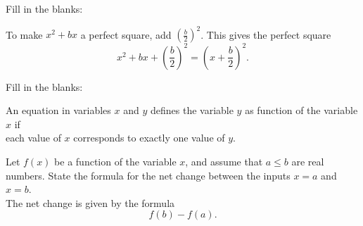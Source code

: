 \documentclass[12pt]{amsart}
\begin{document}
\begin{thm}[3 Points]\label{ex4}
  Fill in the blanks:\\
  \begin{center}
    To make $x^2 + bx$ a perfect square, add $\left(\frac{b}{2}\right)^2$.
    This gives the perfect square
    \vspace{.5in}
    $$x^2 + bx + \left(\frac{b}{2}\right)^2 = \left(x + \frac{b}{2}\right)^2.$$
  \end{center}
\end{thm}
\vspace{.5in}
\begin{thm}[3 Points]\label{ex5}
Fill in the blanks:\\
  \begin{center}
    An equation in variables $x$ and $y$ defines the variable $y$ as function of the variable $x$ if\\
    \vspace{.2in}
    each value of $x$ corresponds to exactly one value of $y$.
  \end{center}
\end{thm}
\vspace{.5in}
\begin{thm}[3 Points]\label{ex6}
    Let $f(x)$ be a function of the variable $x$, and assume that $a \leq b$ are real numbers.
  State the formula for the net change between the inputs $x = a$ and $x = b$.\\
  
  \vspace{.5in}
  The net change is given by the formula
  $$f(b) - f(a).$$
\end{thm}

\newpage
\end{document}
